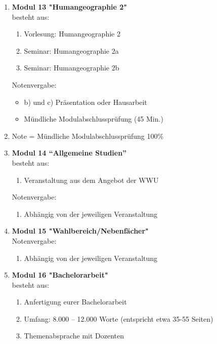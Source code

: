 \begin{enumerate}
 \item \textbf{Modul 13 "Humangeographie 2"}  \\ besteht aus:
  \begin{enumerate}
   \item Vorlesung: Humangeographie 2
   \item Seminar: Humangeographie 2a
   \item Seminar: Humangeographie 2b
  \end{enumerate}
  Notenvergabe:
  \begin{itemize}
   \item b) und c) Präsentation oder Hausarbeit
   \item Mündliche Modulabschlussprüfung (45 Min.)
  \end{itemize}
  \item[] Note = Mündliche Modulabschlussprüfung 100\%

 \item \textbf{Modul 14 ``Allgemeine Studien''}  \\ besteht aus:
  \begin{enumerate}
   \item Veranstaltung aus dem Angebot der WWU
  \end{enumerate}
  Notenvergabe:
  \begin{enumerate}
   \item Abhängig von der jeweiligen Veranstaltung
  \end{enumerate}

 \item \textbf{Modul 15 "Wahlbereich/Nebenfächer"}  \\
  Notenvergabe:
   \begin{enumerate}
    \item Abhängig von der jeweiligen Veranstaltung
   \end{enumerate}
 
 \item \textbf{Modul 16 "Bachelorarbeit"}  \\ besteht aus:
  \begin{enumerate}
   \item Anfertigung eurer Bachelorarbeit 
   \item Umfang: 8.000 – 12.000 Worte (entspricht etwa 35-55 Seiten)
   \item Themenabsprache mit Dozenten
  \end{enumerate}




\end{enumerate}

